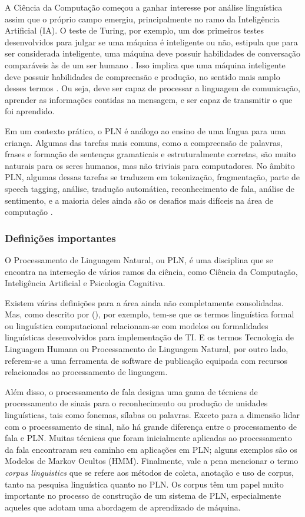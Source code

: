 \documentclass[
	12pt,				%
	openright,			%
	oneside,			%
	a4paper,			%
	english,			%
	spanish,			%
	brazil				%
	]{abntex2}
\begin{document}
	A Ciência da Computação começou a ganhar interesse por análise linguística assim que o próprio campo emergiu, principalmente no ramo da Inteligência Artificial (IA). O teste de Turing, por exemplo, um dos primeiros testes desenvolvidos para julgar se uma máquina é inteligente ou não, estipula que para ser considerada inteligente, uma máquina deve possuir habilidades de conversação comparáveis às de um ser humano \cite{turing}. Isso implica que uma máquina inteligente deve possuir habilidades de compreensão e produção, no sentido mais amplo desses termos \cite{book_natural_lang}. Ou seja, deve ser capaz de processar a linguagem de comunicação, aprender as informações contidas na mensagem, e ser capaz de transmitir o que foi aprendido. 	
	
	Em um contexto prático, o PLN é análogo ao ensino de uma língua para uma criança. Algumas das tarefas mais comuns, como a compreensão de palavras, frases e formação de sentenças gramaticais e estruturalmente corretas, são muito naturais para os seres humanos, mas não triviais para computadores. No âmbito PLN, algumas dessas tarefas se traduzem em tokenização, fragmentação, parte de speech tagging, análise, tradução automática, reconhecimento de fala, análise de sentimento, e a maioria deles ainda são os desafios mais difíceis na área de computação \cite{book_natlang_python}.
		
	\subsubsection*{Definições importantes}
	O Processamento de Linguagem Natural, ou PLN, é uma disciplina que se encontra na interseção de vários ramos da ciência, como Ciência da Computação, Inteligência Artificial e Psicologia Cognitiva. 
	
Existem várias definições para a área ainda não completamente consolidadas. Mas, como descrito por   (\citeyear{book_natural_lang}), por exemplo, tem-se que os termos linguística formal ou linguística computacional relacionam-se com modelos ou formalidades linguísticas desenvolvidos para implementação de TI. E os termos Tecnologia de Linguagem Humana ou Processamento de Linguagem Natural, por outro lado, referem-se a uma ferramenta de software de publicação equipada com recursos relacionados ao processamento de linguagem. 

Além disso, o processamento de fala designa uma gama de técnicas de processamento de sinais para o reconhecimento ou produção de unidades linguísticas, tais como fonemas, sílabas ou palavras. Exceto para a dimensão lidar com o processamento de sinal, não há grande diferença entre o processamento de fala e PLN. Muitas técnicas que foram inicialmente aplicadas ao processamento da fala encontraram seu caminho em aplicações em PLN; alguns exemplos são os Modelos de Markov Ocultos (HMM). Finalmente, vale a pena mencionar o termo \textit{corpus linguistics}  que se refere aos métodos de coleta, anotação e uso de corpus, tanto na pesquisa linguística quanto no PLN. Os corpus têm um papel muito importante no processo de construção de um sistema de PLN, especialmente aqueles que adotam uma abordagem de aprendizado de máquina.
\end{document}
